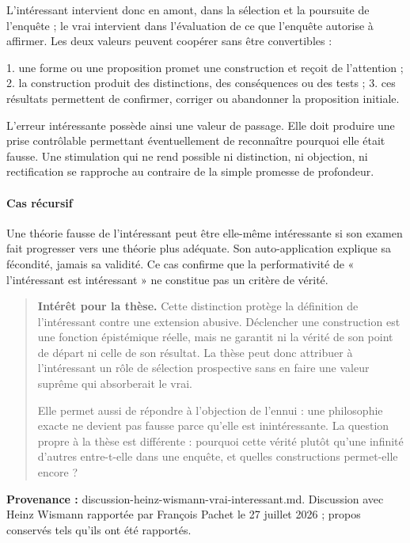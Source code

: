 \documentclass[10pt,a4paper]{article}
\begin{document}
L'intéressant intervient donc en amont, dans la sélection et la poursuite de l'enquête ; le vrai intervient dans l'évaluation de ce que l'enquête autorise à affirmer. Les deux valeurs peuvent coopérer sans être convertibles :

1. une forme ou une proposition promet une construction et reçoit de    l'attention ; 2. la construction produit des distinctions, des conséquences ou des tests ; 3. ces résultats permettent de confirmer, corriger ou abandonner la proposition    initiale.

L'erreur intéressante possède ainsi une valeur de passage. Elle doit produire une prise contrôlable permettant éventuellement de reconnaître pourquoi elle était fausse. Une stimulation qui ne rend possible ni distinction, ni objection, ni rectification se rapproche au contraire de la simple promesse de profondeur.

\paragraph{Cas récursif}
Une théorie fausse de l'intéressant peut être elle-même intéressante si son examen fait progresser vers une théorie plus adéquate. Son auto-application explique sa fécondité, jamais sa validité. Ce cas confirme que la performativité de « l'intéressant est intéressant » ne constitue pas un critère de vérité.

\begin{quote}
\textbf{Intérêt pour la thèse.} Cette distinction protège la définition de l'intéressant contre une extension abusive. Déclencher une construction est une fonction épistémique réelle, mais ne garantit ni la vérité de son point de départ ni celle de son résultat. La thèse peut donc attribuer à l'intéressant un rôle de sélection prospective sans en faire une valeur suprême qui absorberait le vrai.

Elle permet aussi de répondre à l'objection de l'ennui : une philosophie exacte ne devient pas fausse parce qu'elle est inintéressante. La question propre à la thèse est différente : pourquoi cette vérité plutôt qu'une infinité d'autres entre-t-elle dans une enquête, et quelles constructions permet-elle encore ?
\end{quote}
{\footnotesize\color{metadata}\textbf{Provenance :} discussion-heinz-wismann-vrai-interessant.md. Discussion avec Heinz Wismann rapportée par François Pachet le 27 juillet 2026 ; propos conservés tels qu'ils ont été rapportés.\par}
\end{document}
